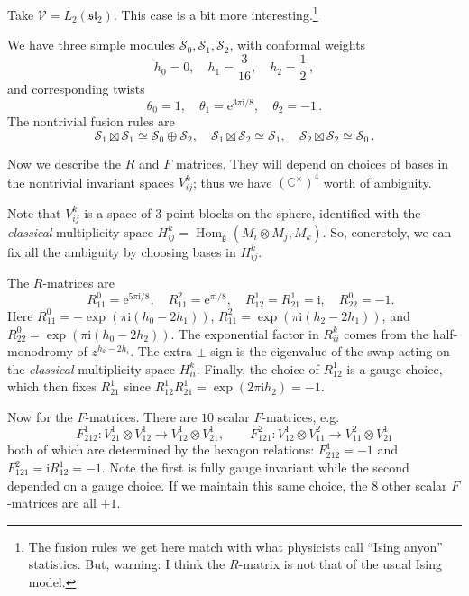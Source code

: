 \documentclass[12pt,letterpaper,reqno]{amsart}
\numberwithin{equation}{section}
\newcommand{\fg}{{\mathfrak g}}
\newcommand{\fsl}{{\mathfrak {sl}}}
\newcommand{\cS}{\ensuremath{\mathcal S}}
\newcommand{\bbC}{\ensuremath{\mathbb C}}
\newcommand{\I}{{\mathrm i}}
\newcommand{\e}{{\mathrm e}}
\newcommand{\vertex}{\mathcal{V}}
\newcommand{\ti}[1]{\textit{#1}}
\DeclareMathOperator{\Hom}{Hom}
\begin{document}
\begin{example}

Take $\vertex = L_2(\fsl_2)$. This case is a bit more interesting.\footnote{The fusion rules we get here match with what physicists call ``Ising anyon'' statistics.
But, warning: I think the $R$-matrix is not that of the usual
Ising model.}

We have three simple modules $\cS_0, \cS_1, \cS_2$,
with conformal weights
\begin{equation}
  h_0 = 0, \quad h_1 = \frac{3}{16}, \quad h_2 = \frac{1}{2} \, ,
\end{equation}
and corresponding twists
\begin{equation}
  \theta_0 = 1, \quad \theta_1 = \e^{3 \pi \I/8}, \quad \theta_2 = -1 \, .
\end{equation}
The nontrivial fusion rules are
\begin{equation}
  \cS_1 \boxtimes \cS_1 \simeq \cS_0 \oplus \cS_2, \quad \cS_1 \boxtimes \cS_2 \simeq \cS_1, \quad \cS_2 \boxtimes \cS_2 \simeq \cS_0 \, . 
\end{equation}

Now we describe the $R$ and $F$ matrices.
They will depend on choices of bases in the nontrivial invariant spaces
$V_{ij}^k$; thus we have $(\bbC^\times)^4$ worth of ambiguity.

Note that $V_{ij}^k$ is a space of 3-point blocks on the sphere,
identified with the \ti{classical} multiplicity space
$H_{ij}^k = \Hom_\fg(M_i \otimes M_j, M_k)$. So, concretely,
we can fix all the ambiguity by choosing bases in $H_{ij}^k$.

The $R$-matrices are
\begin{equation}
\quad R^0_{11} = \e^{5 \pi \I/8}, \quad R^2_{11} = \e^{\pi \I / 8}, \quad R^1_{12} = R^1_{21} = \I, \quad R^0_{22} = -1.
\end{equation}
Here $R^0_{11} = - \exp(\pi \I (h_0-2 h_1))$,
$R^2_{11} = \exp( \pi \I (h_2 - 2 h_1))$,
and $R^0_{22} = \exp( \pi \I (h_0 - 2 h_2))$.
The exponential factor in $R_{ii}^k$
comes from the 
half-monodromy of $z^{h_k - 2 h_i}$.
The extra $\pm$ sign is the eigenvalue
of the swap acting on the \ti{classical} multiplicity space $H_{ii}^k$.
Finally, the choice of $R^1_{12}$ is a gauge choice, which then fixes
$R^1_{21}$ since $R^1_{12} R^1_{21} = \exp(2 \pi \I h_2) = -1$.

Now for the $F$-matrices.
There are $10$ scalar $F$-matrices, e.g.
\begin{equation}
  F_{212}^1: V_{21}^1 \otimes V_{12}^1 \to V_{12}^1 \otimes V_{21}^1, \qquad F_{121}^2: V_{12}^1 \otimes V_{11}^2 \to V_{11}^2 \otimes V_{21}^1
\end{equation}
both of which are determined by the hexagon relations:
$F_{212}^1 = -1$ and $F_{121}^2 = \I R^1_{12} = -1$.
Note the first is fully gauge invariant while the second depended
on a gauge choice.
If we maintain this same choice, the $8$ other scalar
$F$-matrices are all $+1$.


\end{example}
\end{document}
